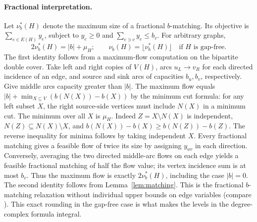 \documentclass[11pt,a4paper]{article}
\theoremstyle{definition}
\begin{document}
\paragraph{Fractional interpretation.}
Let $\nu_b^*(H)$ denote the maximum size of a fractional $b$-matching. Its objective is $\sum_{e\in E(H)}y_e$, subject to $y_e\geq0$ and $\sum_{e\ni v} y_e\leq b_v$. For arbitrary graphs,
\begin{equation}\label{eq:fractional}
 2\nu_b^*(H)=|b|+\mu_H;
 \qquad \nu_b(H)=\lfloor\nu_b^*(H)\rfloor\quad\text{if $H$ is gap-free}.
\end{equation}
The first identity follows from a maximum-flow computation on the bipartite double cover. Take left and right copies of $V(H)$, arcs $u_L\to v_R$ for each directed incidence of an edge, and source and sink arcs of capacities $b_u,b_v$, respectively. Give middle arcs capacity greater than $|b|$. The maximum flow equals $|b|+\min_{X\subseteq V}(b(N(X))-b(X))$ by the minimum cut formula: for any left subset $X$, the right source-side vertices must include $N(X)$ in a minimum cut. The minimum over all $X$ is $\mu_H$. Indeed $Z=X\setminus N(X)$ is independent, $N(Z)\subseteq N(X)\setminus X$, and $b(N(X))-b(X)\geq b(N(Z))-b(Z)$. The reverse inequality for minima follows by taking independent $X$. Every fractional matching gives a feasible flow of twice its size by assigning $y_{uv}$ in each direction. Conversely, averaging the two directed middle-arc flows on each edge yields a feasible fractional matching of half the flow value; its vertex incidence sum is at most $b_v$. Thus the maximum flow is exactly $2\nu_b^*(H)$, including the case $|b|=0$. The second identity follows from Lemma~\ref{lem:matching}. This is the fractional $b$-matching relaxation without individual upper bounds on edge variables (compare \cite[Section 30.2 and Chapters 21, 31]{Schrijver}). This exact rounding in the gap-free case is what makes the levels in the degree-complex formula integral.
\end{document}
